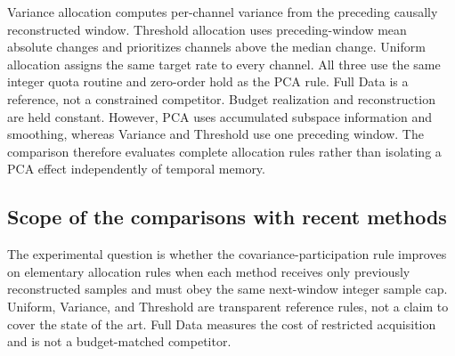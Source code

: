 \documentclass[12pt]{article}
\begin{document}
Variance allocation computes per-channel variance from the preceding causally
reconstructed window. Threshold allocation uses preceding-window mean absolute
changes and prioritizes channels above the median change. Uniform allocation
assigns the same target rate to every channel. All three use the same integer
quota routine and zero-order hold as the PCA rule. Full Data is a reference,
not a constrained competitor. Budget realization and reconstruction are held constant. However, PCA uses
accumulated subspace information and smoothing, whereas Variance and Threshold
use one preceding window. The comparison therefore evaluates complete allocation
rules rather than isolating a PCA effect independently of temporal memory.

\subsection{Scope of the comparisons with recent methods}
The experimental question is whether the covariance-participation rule improves
on elementary allocation rules when each method receives only previously
reconstructed samples and must obey the same next-window integer sample cap.
Uniform, Variance, and Threshold are transparent reference rules, not a claim
to cover the state of the art. Full Data measures the cost of restricted
acquisition and is not a budget-matched competitor.
\end{document}
